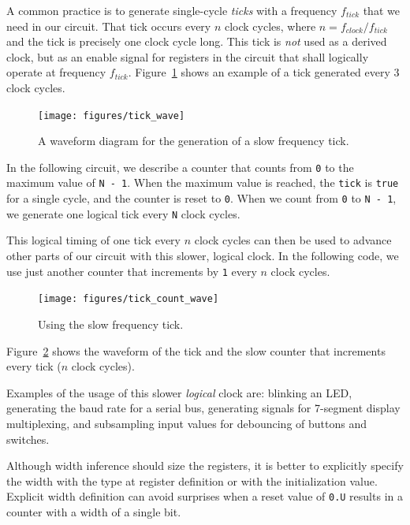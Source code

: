 \documentclass[%
    10pt,
    headinclude, footexclude,
    openright, %
    notitlepage,
    cleardoubleempty,
    headsepline,
    pointlessnumbers,
    bibtotoc, idxtotoc,
    ]{scrbook}
\newcommand{\code}[1]{{\small{\texttt{#1}}}}
\begin{document}
A common practice is to generate single-cycle \emph{ticks} with a frequency $f_{tick}$
that we need in our circuit. That tick occurs every $n$ clock cycles,
where $n = f_{clock}/f_{tick}$ and the tick is precisely one clock cycle long.
This tick is \emph{not} used as a derived clock, but as an enable signal for
registers in the circuit that shall logically operate at frequency $f_{tick}$.
Figure~\ref{fig:tick-wave} shows an example of a tick generated every
3 clock cycles.

\begin{figure}
  \centering
  \texttt{[image: figures/tick\_wave]}
  \caption{A waveform diagram for the generation of a slow frequency tick.}
  \label{fig:tick-wave}
\end{figure}


In the following circuit, we describe a counter that counts from \code{0}
to the maximum value of \code{N - 1}. When the maximum value is reached,
the \code{tick} is \code{true} for a single cycle, and the counter is reset to \code{0}.
When we count from \code{0} to \code{N - 1}, we generate one logical tick
every \code{N} clock cycles.


\noindent This logical timing of one tick every $n$ clock cycles can then be used
to advance other parts of our circuit with this slower, logical clock.
In the following code, we use just another counter that increments by \code{1}
every $n$ clock cycles.


\begin{figure}
  \centering
  \texttt{[image: figures/tick\_count\_wave]}
  \caption{Using the slow frequency tick.}
  \label{fig:tick-count-wave}
\end{figure}

\noindent Figure~\ref{fig:tick-count-wave} shows the waveform of the tick and the
slow counter that increments every tick ($n$ clock cycles).

Examples of the usage of this slower \emph{logical} clock are: blinking an LED,
generating the baud rate for a serial bus, generating signals for 7-segment
display multiplexing, and subsampling input values for debouncing of buttons
and switches.

Although width inference should size the registers, it is better to explicitly
specify the width with the type at register definition or with the
initialization value. Explicit width definition can avoid surprises when a reset value of \code{0.U}
results in a counter with a width of a single bit.
\end{document}
